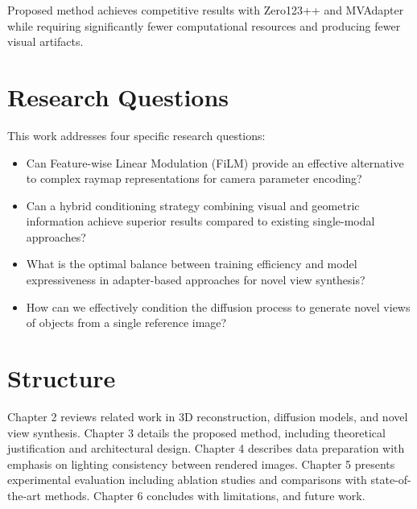 Proposed method achieves competitive results with Zero123++ \cite{zero1to3} and MVAdapter \cite{mvadapter} while requiring significantly fewer computational resources and producing fewer visual artifacts.

\section{Research Questions}

This work addresses four specific research questions:
\begin{itemize}
  \item Can Feature-wise Linear Modulation (FiLM) provide an effective alternative to complex raymap representations for camera parameter encoding?
  \item Can a hybrid conditioning strategy combining visual and geometric information achieve superior results compared to existing single-modal approaches?
  \item What is the optimal balance between training efficiency and model expressiveness in adapter-based approaches for novel view synthesis?
  \item How can we effectively condition the diffusion process to generate novel views of objects from a single reference image?
\end{itemize}

\section{Structure}

Chapter 2 reviews related work in 3D reconstruction, diffusion models, and novel view synthesis. Chapter 3 details the proposed method, including theoretical justification and architectural design. Chapter 4 describes data preparation with emphasis on lighting consistency between rendered images. Chapter 5 presents experimental evaluation including ablation studies and comparisons with state-of-the-art methods. Chapter 6 concludes with limitations, and future work.
